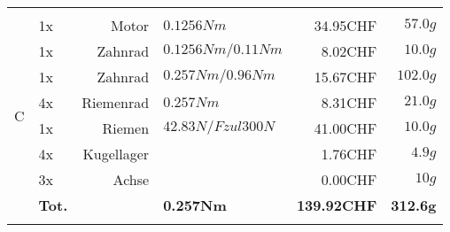 \begin{longtable}{p{0.5cm}p{0.8cm}rp{3cm}rr}
          &       &                 &                      &          &  \\
    \multirow{8}[2]{*}{C} 
          & 1x    & Motor           & $0.1256 Nm$          & 34.95CHF & $57.0 g$ \\
          & 1x    & Zahnrad         & $0.1256 Nm / 0.11 Nm$& 8.02CHF  & $10.0 g$ \\
          & 1x    & Zahnrad         & $0.257 Nm / 0.96 Nm$ & 15.67CHF & $102.0 g$ \\
          & 4x    & Riemenrad       & $0.257 Nm$           & 8.31CHF  & $21.0 g$ \\
          & 1x    & Riemen          & $42.83 N /Fzul 300 N $ & 41.00CHF & $10.0 g$ \\
          & 4x    & Kugellager      &                      & 1.76CHF  & $4.9 g$ \\
          & 3x    & Achse           &                      & 0.00CHF  & $10 g$ \\
          & \textbf{Tot.} &       & \textbf{0.257Nm} & \textbf{139.92CHF} & \textbf{312.6g} \\
          &       &                 &                      &          &  \\       
    \end{longtable}